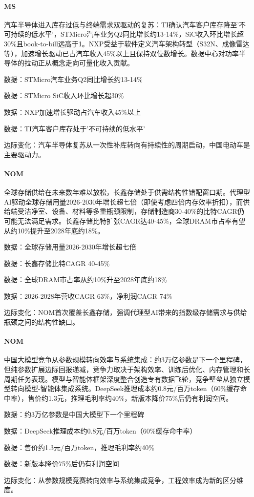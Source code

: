 \documentclass[11pt]{ctexart}
\begin{document}
\paragraph{MS} 汽车半导体进入库存过低与终端需求双驱动的复苏：TI确认汽车客户库存降至'不可持续的低水平'，STMicro汽车业务Q2同比增长约13-14\%，SiC收入环比增长超30\%且book-to-bill远高于1。NXP受益于软件定义汽车架构转型（S32N、成像雷达等），加速增长驱动已占汽车收入45\%以上且保持双位数增长。数据中心对功率半导体的拉动正从概念走向可量化收入贡献。
{\small\color{refgray}数据：STMicro汽车业务Q2同比增长约13-14\%\par}
{\small\color{refgray}数据：STMicro SiC收入环比增长超30\%\par}
{\small\color{refgray}数据：NXP加速增长驱动占汽车收入45\%以上\par}
{\small\color{refgray}数据：TI汽车客户库存处于'不可持续的低水平'\par}
{\small\color{refgray}边际变化：汽车半导体复苏从一次性补库转向有持续性的周期启动，中国电动车是主要驱动力。\par}
\paragraph{NOM} 全球存储供给在未来数年难以放松，长鑫存储处于供需结构性错配窗口期。代理型AI驱动全球存储用量2026-2030年增长超七倍（即使考虑四倍内存效率折扣），而供给端受洁净室、设备、材料等多重瓶颈限制，存储制造商30-40\%的比特CAGR仍可能无法满足需求。长鑫存储比特扩张CAGR达40-45\%，全球DRAM市占率有望从约10\%提升至2028年底约18\%。
{\small\color{refgray}数据：全球存储用量2026-2030年增长超七倍\par}
{\small\color{refgray}数据：长鑫存储比特CAGR 40-45\%\par}
{\small\color{refgray}数据：全球DRAM市占率从约10\%升至2028年底约18\%\par}
{\small\color{refgray}数据：2026-2028年营收CAGR 63\%，净利润CAGR 74\%\par}
{\small\color{refgray}边际变化：NOM首次覆盖长鑫存储，强调代理型AI带来的指数级存储需求与供给瓶颈之间的结构性缺口。\par}
\paragraph{NOM} 中国大模型竞争从参数规模转向效率与系统集成：约3万亿参数是下一个里程碑，但纯参数扩展边际回报递减，竞争力取决于架构效率、训练后优化、内存管理和长周期任务表现。模型与智能体框架深度整合创造专有数据飞轮，竞争壁垒从独立模型转向模型-智能体集成系统。DeepSeek推理成本约0.8元/百万token（60\%缓存命中率），售价约1.3元，推理毛利率约40\%，新版本降价75\%后仍有利润空间。
{\small\color{refgray}数据：约3万亿参数是中国大模型下一个里程碑\par}
{\small\color{refgray}数据：DeepSeek推理成本约0.8元/百万token（60\%缓存命中率）\par}
{\small\color{refgray}数据：售价约1.3元/百万token，推理毛利率约40\%\par}
{\small\color{refgray}数据：新版本降价75\%后仍有利润空间\par}
{\small\color{refgray}边际变化：从参数规模竞赛转向效率与系统集成竞争，工程效率成为新的区分维度。\par}
\end{document}
